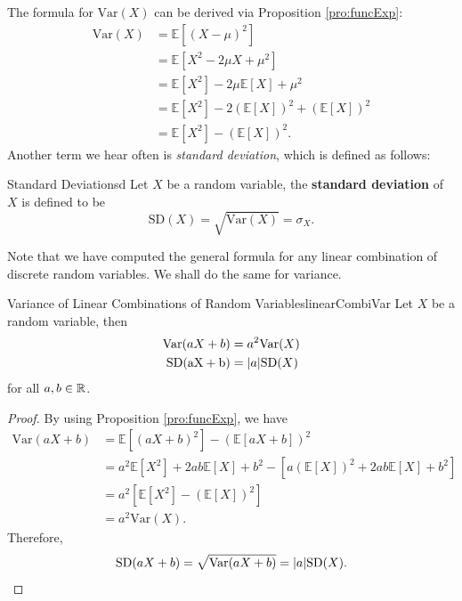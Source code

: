 \documentclass[math]{amznotes}
\theoremstyle{remark}
\newcommand{\0}{\mathbf{0}}
\newcommand{\1}{\mathbf{1}}
\begin{document}
The formula for $\mathrm{Var}(X)$ can be derived via Proposition \ref{pro:funcExp}:
\begin{align*}
    \mathrm{Var}(X) & = \mathbb{E}[(X - \mu)^2] \\
    & = \mathbb{E}[X^2 - 2\mu X + \mu^2] \\
    & = \mathbb{E}[X^2] - 2\mu \mathbb{E}[X] + \mu^2 \\
    & = \mathbb{E}[X^2] - 2(\mathbb{E}[X])^2 + (\mathbb{E}[X])^2 \\
    & = \mathbb{E}[X^2] - (\mathbb{E}[X])^2.
\end{align*}
Another term we hear often is \textit{standard deviation}, which is defined as follows:
\begin{dfnbox}{Standard Deviation}{sd}
    Let $X$ be a random variable, the {\color{red} \textbf{standard deviation}} of $X$ is defined to be
    \begin{equation*}
        \mathrm{SD}(X) = \sqrt{\mathrm{Var}(X)} = \sigma_X.
    \end{equation*}
\end{dfnbox}
Note that we have computed the general formula for any linear combination of discrete random variables. We shall do the same for variance.
\begin{probox}{Variance of Linear Combinations of Random Variables}{linearCombiVar}
    Let $X$ be a random variable, then
    \begin{align*}
        \mathrm{Var}(aX + b) & = a^2\mathrm{Var}(X) \\
        \mathrm{SD(aX + b)} & ={\left\lvert {a} \right\rvert}\mathrm{SD}(X)
    \end{align*}
    for all $a, b \in \mathbb{R}$.
    \tcblower
    \begin{proof}
        By using Proposition \ref{pro:funcExp}, we have
        \begin{align*}
            \mathrm{Var}(aX + b) & = \mathbb{E}[(aX + b)^2] - (\mathbb{E}[aX + b])^2 \\
            & = a^2 \mathbb{E}[X^2] + 2ab \mathbb{E}[X] + b^2 - \left[a(\mathbb{E}[X])^2 + 2ab\mathbb{E}[X] + b^2\right] \\
            & = a^2\left[\mathbb{E}[X^2] - (\mathbb{E}[X])^2\right] \\
            & = a^2\mathrm{Var}(X).
        \end{align*}
        Therefore,
        \begin{equation*}
            \mathrm{SD}(aX + b) = \sqrt{\mathrm{Var}(aX + b)} = {\left\lvert {a} \right\rvert}\mathrm{SD}(X).
        \end{equation*}
    \end{proof}
\end{probox}
\end{document}
